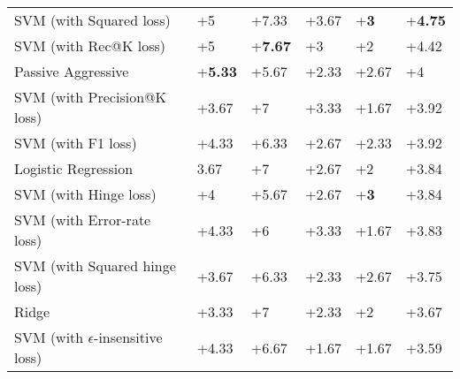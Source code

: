 \begin{table}[h]
{\begin{tabular}{@{}llllll@{}}
SVM (with Squared loss)                               & +5                       & +7.33                       & +3.67                    & +\textbf{3}                          & +\textbf{4.75}             \\ 
SVM (with Rec@K loss)                                                                      & +5                       & +\textbf{7.67}                       & +{3}              & +2                          & +{4.42}    \\ 
Passive Aggressive                                       & +\textbf{5.33}           & +5.67              & +2.33                    & +2.67                       & +4                \\ 
SVM (with Precision@K loss)                                                                 & +3.67                    & +7                          & +3.33                    & +{1.67}              & +3.92             \\ 
SVM (with F1 loss)                                                                          & +4.33                    & +6.33                       & +2.67                    & +2.33                       & +3.92             \\ 
Logistic Regression                                                      & 3.67                    & +7                          & +2.67                    & +2                          & +3.84             \\ 
SVM (with Hinge loss)                                                                        & +4                       & +5.67                       & +2.67                    & +\textbf{3}                          & +3.84             \\ 
SVM (with Error-rate loss)                                                                    & +4.33                    & +6                          & +3.33                    & +1.67                       & +3.83             \\ 
SVM (with Squared hinge loss)                                                              & +3.67                    & +6.33                       & +2.33                    & +2.67                       & +3.75             \\ 
Ridge                                                             & +3.33                    & +7                          & +2.33                    & +2                          & +3.67             \\ 
SVM (with $\epsilon$-insensitive loss)                         & +4.33                    & +6.67                       & +1.67                    & +1.67                       & +3.59             \\ 

\end{tabular}}
\end{table}
